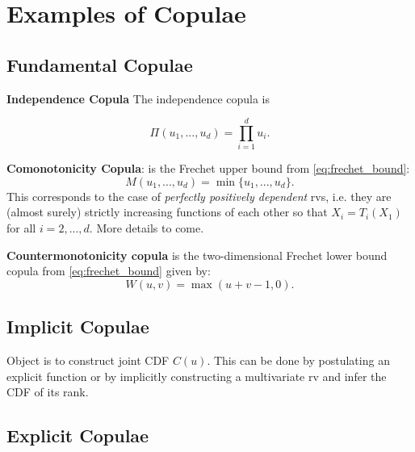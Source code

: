 \section{Examples of Copulae}
\subsection{Fundamental Copulae}

{\bf Independence Copula} The independence copula is 

\begin{equation}
	\Pi(u_1,...,u_d) = \prod_{i=1}^{d} u_i.
\end{equation}

{\bf Comonotonicity Copula}: is the Frechet upper bound from \eqref{eq:frechet_bound}:
\begin{equation}
	M(u_1,...,u_d) = \min \{u_1,..., u_d\}.
\end{equation}
This corresponds to the case of {\it perfectly positively dependent} rvs, i.e. they are (almost surely) strictly increasing functions of each other so that $X_i = T_i(X_1)$ for all $i=2,...,d$. More details to come.

{\bf Countermonotonicity copula} is the two-dimensional Frechet lower bound copula from \eqref{eq:frechet_bound} given by:
\begin{equation}
	W(u, v) = \max (u + v -1, 0).
\end{equation}

\subsection{Implicit Copulae}
Object is to construct joint CDF $C(u)$. This can be done by postulating an explicit function or by implicitly constructing a multivariate rv and infer the CDF of its rank.
\subsection{Explicit Copulae}